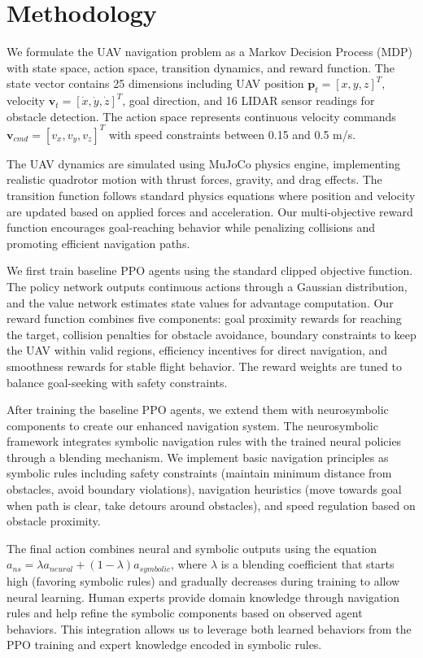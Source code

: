 \documentclass[pdflatex,sn-mathphys-num]{sn-jnl}
\theoremstyle{thmstyleone}%
\theoremstyle{thmstyletwo}%
\theoremstyle{thmstylethree}%
\begin{document}
\section{Methodology}

We formulate the UAV navigation problem as a Markov Decision Process (MDP) with state space, action space, transition dynamics, and reward function. The state vector contains 25 dimensions including UAV position $\mathbf{p}_t = [x, y, z]^T$, velocity $\mathbf{v}_t = [\dot{x}, \dot{y}, \dot{z}]^T$, goal direction, and 16 LIDAR sensor readings for obstacle detection. The action space represents continuous velocity commands $\mathbf{v}_{cmd} = [v_x, v_y, v_z]^T$ with speed constraints between 0.15 and 0.5 m/s.

The UAV dynamics are simulated using MuJoCo physics engine, implementing realistic quadrotor motion with thrust forces, gravity, and drag effects. The transition function follows standard physics equations where position and velocity are updated based on applied forces and acceleration. Our multi-objective reward function encourages goal-reaching behavior while penalizing collisions and promoting efficient navigation paths.

We first train baseline PPO agents using the standard clipped objective function. The policy network outputs continuous actions through a Gaussian distribution, and the value network estimates state values for advantage computation. Our reward function combines five components: goal proximity rewards for reaching the target, collision penalties for obstacle avoidance, boundary constraints to keep the UAV within valid regions, efficiency incentives for direct navigation, and smoothness rewards for stable flight behavior. The reward weights are tuned to balance goal-seeking with safety constraints.

After training the baseline PPO agents, we extend them with neurosymbolic components to create our enhanced navigation system. The neurosymbolic framework integrates symbolic navigation rules with the trained neural policies through a blending mechanism. We implement basic navigation principles as symbolic rules including safety constraints (maintain minimum distance from obstacles, avoid boundary violations), navigation heuristics (move towards goal when path is clear, take detours around obstacles), and speed regulation based on obstacle proximity.

The final action combines neural and symbolic outputs using the equation $a_{ns} = \lambda a_{neural} + (1-\lambda) a_{symbolic}$, where $\lambda$ is a blending coefficient that starts high (favoring symbolic rules) and gradually decreases during training to allow neural learning. Human experts provide domain knowledge through navigation rules and help refine the symbolic components based on observed agent behaviors. This integration allows us to leverage both learned behaviors from the PPO training and expert knowledge encoded in symbolic rules. 
\end{document}

